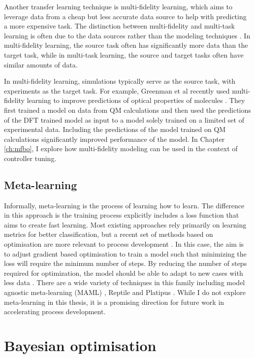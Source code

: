Another transfer learning technique is multi-fidelity learning, which aims to leverage data from a cheap but less accurate data source to help with predicting a more expensive task. The distinction between multi-fidelity and multi-task learning is often due to the data sources rather than the modeling techniques \cite{Folch2023, Perdikaris2016, Pan2017, Tran2020, Greenman2022}. In multi-fidelity learning, the source task often has significantly more data than the target task, while in multi-task learning, the source and target tasks often have similar amounts of data. 

In multi-fidelity learning, simulations typically serve as the source task, with experiments as the target task. For example, Greenman et al recently used multi-fidelity learning to improve predictions of optical properties of molecules \cite{Greenman2022}. They first trained a model on data from QM calculations and then used the predictions of the DFT trained model as input to a model solely trained on a limited set of experimental data. Including the predictions of the model trained on QM calculations significantly improved performance of the model. In Chapter \ref{ch:mfbo}, I explore how multi-fidelity modeling can be used in the context of controller tuning.

\subsection{Meta-learning}

Informally, meta-learning is the process of learning how to learn. The difference in this approach is the training process explicitly includes a loss function that aims to create fast learning. Most existing approaches rely primarily on learning metrics for better classification, but a recent set of methods based on optimisation are more relevant to process development \cite{Huisman2021}.  In this case, the aim is to adjust gradient based optimisation to train a model such that minimizing the loss will require the minimum number of steps. By reducing the number of steps required for optimization, the model should be able to adapt to new cases with less data \cite{Fingerhut2017}. There are a wide variety of techniques in this family including model agnostic meta-learning (MAML) \cite{Finn2017}, Reptile \cite{Nichols2018} and Platipus \cite{Finn2018}. While I do not explore meta-learning in this thesis, it is a promising direction for future work in accelerating process development.


\section{Bayesian optimisation}

